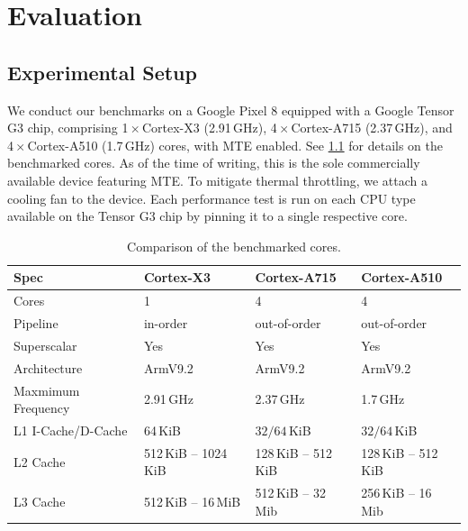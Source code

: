 \chapter{Evaluation}
\label{ch:eval}


\section{Experimental Setup}\label{sec:experimental-setup}

We conduct our benchmarks on a Google Pixel 8 equipped with a Google Tensor G3 chip, comprising 1\,$\times$\,Cortex-X3 (2.91\,GHz), 4\,$\times$\,Cortex-A715 (2.37\,GHz), and 4\,$\times$\,Cortex-A510 (1.7\,GHz) cores, with \ac{MTE} enabled.
See \cref{tab:cores-comparison} for details on the benchmarked cores.
As of the time of writing, this is the sole commercially available device featuring \ac{MTE}.
To mitigate thermal throttling, we attach a cooling fan to the device.
Each performance test is run on each CPU type available on the Tensor G3 chip by pinning it to a single respective core.


\begin{table}[ht]
    \centering
    \small
    \caption{Comparison of the benchmarked cores.}
    \label{tab:cores-comparison}
    \begin{tabular}{l || l | l | l}
        \textbf{Spec}      & \textbf{Cortex-X3}    & \textbf{Cortex-A715} & \textbf{Cortex-A510} \\
        \hline
        Cores              & 1                     & 4                    & 4                    \\
        Pipeline           & in-order              & out-of-order         & out-of-order         \\
        Superscalar        & Yes                   & Yes                  & Yes                  \\
        Architecture       & ArmV9.2               & ArmV9.2              & ArmV9.2              \\
        Maxmimum Frequency & 2.91\,GHz             & 2.37\,GHz            & 1.7\,GHz             \\
        L1 I-Cache/D-Cache & 64\,KiB               & $32/64$\,KiB         & $32/64$\,KiB         \\
        L2 Cache           & 512\,KiB -- 1024\,KiB & 128\,KiB -- 512\,KiB & 128\,KiB -- 512\,KiB \\
        L3 Cache           & 512\,KiB -- 16\,MiB   & 512\,KiB -- 32\,Mib  & 256\,KiB -- 16\,Mib  \\
    \end{tabular}
\end{table}


